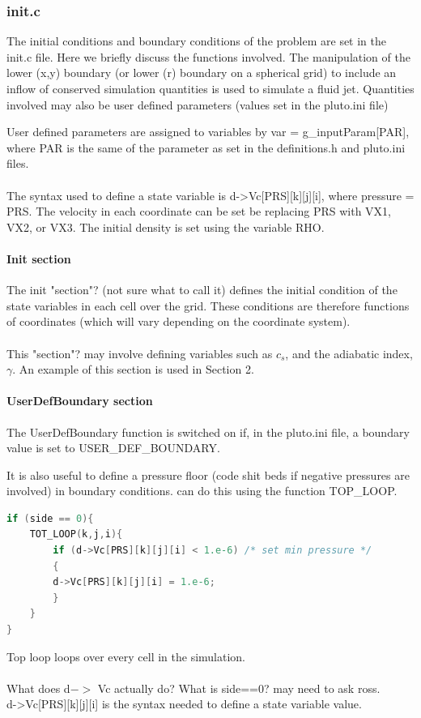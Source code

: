 \documentclass[12pt]{article}
\begin{document}
\subsubsection{init.c}
The initial conditions and boundary conditions of the problem are set in the init.c file. Here we briefly discuss the functions involved. The manipulation of the lower (x,y) boundary (or lower (r) boundary on a spherical grid) to include an inflow of conserved simulation quantities is used to simulate a fluid jet. Quantities involved may also be user defined parameters (values set in the pluto.ini file)

User defined parameters are assigned to variables by var = g\_inputParam[PAR], where PAR is the same of the parameter as set in the definitions.h and pluto.ini files.\\
\\
The syntax used to define a state variable is d->Vc[PRS][k][j][i], where pressure = PRS. The velocity in each coordinate can be set be replacing PRS with VX1, VX2, or VX3. The initial density is set using the variable RHO.

\paragraph{Init section}
The init "section"? (not sure what to call it) defines the initial condition of the state variables in each cell over the grid. These conditions are therefore functions of coordinates (which will vary depending on the coordinate system).\\
\\
This "section"? may involve defining variables such as $c_s$, and the adiabatic index, $\gamma$. An example of this section is used in Section 2.\\

\paragraph{UserDefBoundary section}
The UserDefBoundary function is switched on if, in the pluto.ini file, a boundary value is set to USER\_DEF\_BOUNDARY.

It is also useful to define a pressure floor (code shit beds if negative pressures are involved) in boundary conditions. can do this using the function TOP\_LOOP.
\begin{lstlisting}[language=C++]
if (side == 0){
	TOT_LOOP(k,j,i){
		if (d->Vc[PRS][k][j][i] < 1.e-6) /* set min pressure */
		{
		d->Vc[PRS][k][j][i] = 1.e-6;
		}
	}
}
\end{lstlisting}
Top loop loops over every cell in the simulation.\\
\\
What does d$->$ Vc actually do? What is side==0? may need to ask ross.\\
d->Vc[PRS][k][j][i] is the syntax needed to define a state variable value.
\end{document}
